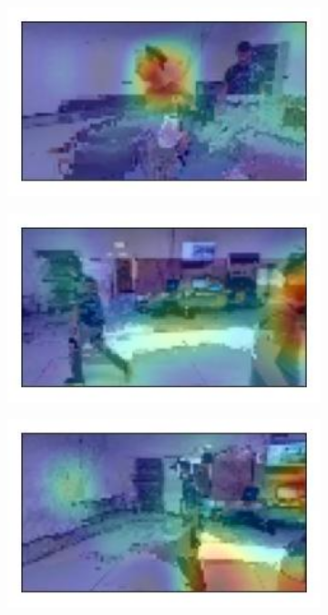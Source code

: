\begin{figure}[!h]
	\begin{center}
		\begin{subfigure}[h]{0.24\textwidth}
			\centering
			\includegraphics[width=1\textwidth]{"contents/images/gradcam/gradcam-glitch-1"}
		\end{subfigure}
		\hfill
		\begin{subfigure}[h]{0.24\textwidth}
			\centering
			\includegraphics[width=1\textwidth]{"contents/images/gradcam/gradcam-glitch-2"}
		\end{subfigure}
		\hfill
		\begin{subfigure}[h]{0.24\textwidth}
			\centering
			\includegraphics[width=1\textwidth]{"contents/images/gradcam/gradcam-glitch-3"}

\end{subfigure}
\end{center}
\end{figure}
